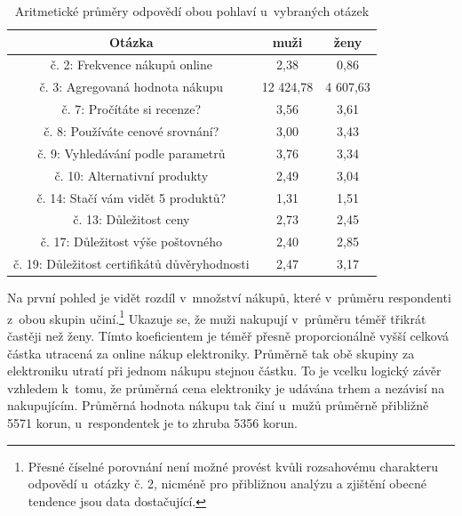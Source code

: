 \documentclass[12pt,twoside,openany]{fithesis}
\begin{document}
                \begin{table}[htb]
                    \begin{center}%
                        \begin{tabular}{|c|c|c|}
                            \hline 
                            {{Otázka}} & {{muži}} & {{ženy}} \tabularnewline
                             \hline 
                             {{č. 2: Frekvence nákupů online}} & {{2,38}} & 
{{0,86}} \tabularnewline
                              \hline 
                              {{č. 3: Agregovaná hodnota nákupu}} & {{12 
424,78}} & {{4 607,63}} \tabularnewline
                               \hline 
                               {{č. 7: Pročítáte si recenze?}} & {{3,56}} & 
{{3,61}} \tabularnewline
                                \hline 
                                {{č. 8: Používáte cenové srovnání?}} & 
{{3,00}} & {{3,43}} \tabularnewline
                                 \hline 
                                 {{č. 9: Vyhledávání podle parametrů}} & 
{{3,76}} & {{3,34}} \tabularnewline
                                  \hline 
                                  {{č. 10: Alternativní produkty}} & {{2,49}} 
& {{3,04}} \tabularnewline
                                   \hline 
                                   {{č. 14: Stačí vám vidět 5 produktů?}} 
& {{1,31}} & {{1,51}} \tabularnewline
                                    \hline 
                                    {{č. 13: Důležitost ceny}} & {{2,73}} & 
{{2,45}} \tabularnewline
                                     \hline 
                                     {{č. 17: Důležitost výše 
poštovného}} & {{2,40}} & {{2,85}} \tabularnewline
                                      \hline 
                                      {{č. 19: Důležitost certifikátů 
důvěryhodnosti}} & {{2,47}} & {{3,17}} \tabularnewline
                                      \hline 
                                  \end{tabular}
                                  \caption{Aritmetické průměry odpovědí obou pohlaví u~vybraných otázek}\label{tab-prumery}
                              \end{center}
                          \end{table}

                          Na první pohled je vidět rozdíl v~množství 
nákupů, které v~průměru respondenti z~obou skupin 
učiní.\footnote{
                              Přesné číselné porovnání není možné 
provést kvůli rozsahovému charakteru odpovědí u~otázky č. 2, nicméně 
pro přibližnou analýzu a zjištění obecné tendence jsou data 
dostačující.
                          }
Ukazuje se, že muži nakupují v~průměru téměř třikrát častěji než 
ženy. Tímto koeficientem je téměř přesně proporcionálně vyšší 
celková částka utracená za online nákup elektroniky. Průměrně tak obě 
skupiny za elektroniku utratí při jednom nákupu stejnou částku. To je 
vcelku logický závěr vzhledem k~tomu, že průměrná cena elektroniky je 
udávána trhem a nezávisí na nakupujícím. Průměrná hodnota nákupu tak 
činí u~mužů průměrně přibližně 5571 korun, u~respondentek je 
to zhruba 5356 korun.
\end{document}
